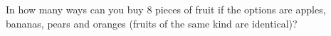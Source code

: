 In how many ways can you buy $8$ pieces of fruit if the options are apples, bananas, pears and oranges (fruits of the same kind are identical)?

